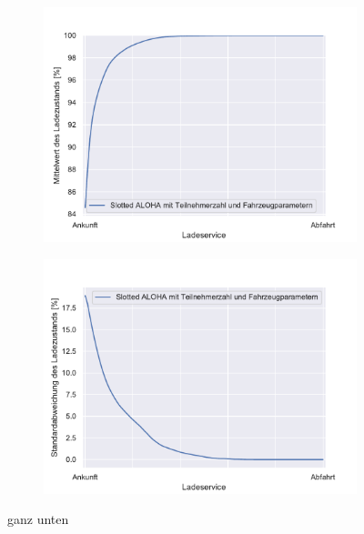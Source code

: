 \begin{figure}
	\begin{subfigure}{0.49\linewidth}
		\includegraphics[width=\linewidth]{img/SA_wT/SlottedAloha_waitingTime_VDE_tau_6_soc_mean.pdf}
        \label{ABB_SAwtSocMEAN}
	\end{subfigure}
	\begin{subfigure}{0.49\linewidth}
		\includegraphics[width=\linewidth]{img/SA_wT/SlottedAloha_waitingTime_VDE_tau_6_soc_std.pdf}
        \label{ABB_SAwtSocSTD}
	\end{subfigure}
	\caption{ganz unten}
\end{figure}

